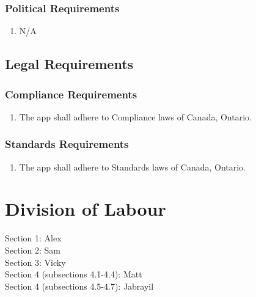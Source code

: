 \documentclass[]{article}
\begin{document}
\begin{enumerate}[{VP}1.]
\subsubsection{Political Requirements}
\label{ssub:political_requirements}
\begin{enumerate}[{CP}1. ]
	\item N/A
\end{enumerate}


\subsection{Legal Requirements}
\label{sub:legal_requirements}

\subsubsection{Compliance Requirements}
\label{ssub:compliance_requirements}
\begin{enumerate}[{LR}1. ]
	\item The app shall adhere to Compliance laws of Canada, Ontario.
\end{enumerate}

\subsubsection{Standards Requirements}
\label{ssub:standards_requirements}
\begin{enumerate}[{LR}1. ]
	\item The app shall adhere to Standards laws of Canada, Ontario.
\end{enumerate}



\section{Division of Labour}
\label{sec:division_of_labour}
Section 1: Alex \\
Section 2: Sam \\
Section 3: Vicky \\
Section 4 (subsections 4.1-4.4): Matt \\
Section 4 (subsections 4.5-4.7): Jabrayil \\


\end{enumerate}
\end{document}
